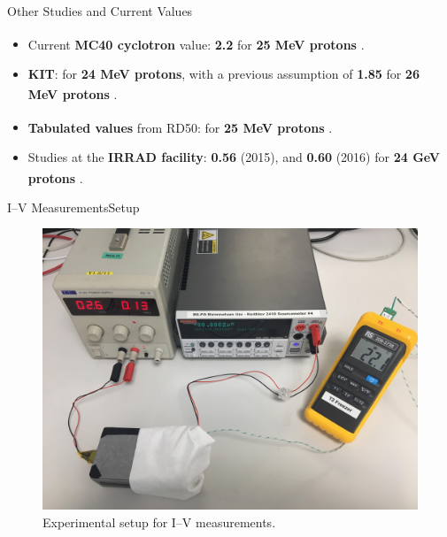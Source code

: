 \documentclass{beamer}
\begin{document}
\begin{frame}{Other Studies and Current Values}
\begin{itemize}
    \item Current \textbf{MC40 cyclotron} value: \textbf{2.2} for \textbf{25 MeV protons} \textsuperscript{\cite{krakow}}.
    \vspace{0.5cm}
    \item \textbf{KIT}:  for \textbf{24 MeV protons}, with a previous assumption of \textbf{1.85} for \textbf{26 MeV protons} \textsuperscript{\cite{Karlsruhe}}.
    \vspace{0.5cm}
    \item \textbf{Tabulated values} from RD50:  for \textbf{25 MeV protons} \textsuperscript{\cite{RD50}}.
    \vspace{0.5cm}
    \item Studies at the \textbf{IRRAD facility}: \textbf{0.56} (2015), and \textbf{0.60} (2016) for \textbf{24 GeV protons} \textsuperscript{\cite{IRRAD}}. 
\end{itemize}
    
\end{frame}

    \begin{frame}{I--V Measurements}{Setup}
        \begin{figure}
            \centering
            \includegraphics[width = 0.7\linewidth]{IV_Setup.jpg}
            \caption{Experimental setup for I--V measurements.}
            \label{fig:IVSetup}
        \end{figure}
    \end{frame}
    
\end{document}
